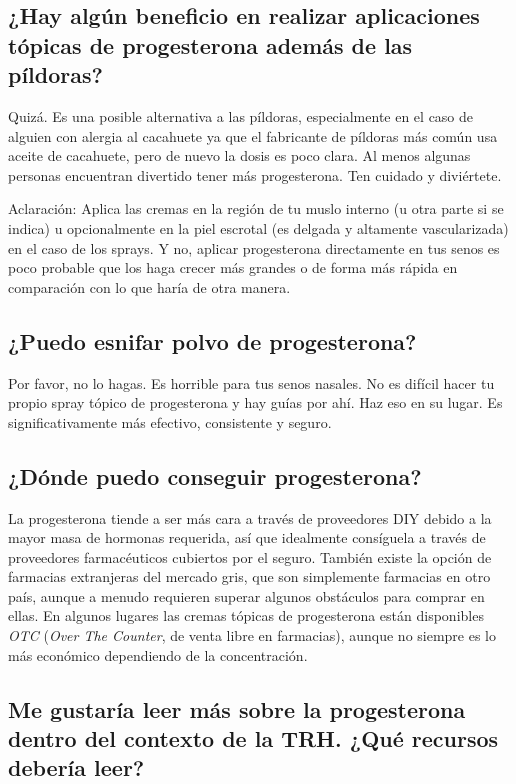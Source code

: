 \documentclass{article}
\begin{document}
\subsection{¿Hay algún beneficio en realizar aplicaciones tópicas de progesterona además de las píldoras?}

Quizá. Es una posible alternativa a las píldoras, especialmente en el caso de alguien con alergia al cacahuete ya que el fabricante de píldoras más común usa aceite de cacahuete, pero de nuevo la dosis es poco clara. Al menos algunas personas encuentran divertido tener más progesterona. Ten cuidado y diviértete.

Aclaración: Aplica las cremas en la región de tu muslo interno (u otra parte si se indica) u opcionalmente en la piel escrotal (es delgada y altamente vascularizada) en el caso de los sprays. Y no, aplicar progesterona directamente en tus senos es poco probable que los haga crecer más grandes o de forma más rápida en comparación con lo que haría de otra manera.

\subsection{¿Puedo esnifar polvo de progesterona?}

Por favor, no lo hagas. Es horrible para tus senos nasales. No es difícil hacer tu propio spray tópico de progesterona y hay guías por ahí. Haz eso en su lugar. Es significativamente más efectivo, consistente y seguro.

\subsection{¿Dónde puedo conseguir progesterona?}

La progesterona tiende a ser más cara a través de proveedores DIY debido a la mayor masa de hormonas requerida, así que idealmente consíguela a través de proveedores farmacéuticos cubiertos por el seguro. También existe la opción de farmacias extranjeras del mercado gris, que son simplemente farmacias en otro país, aunque a menudo requieren superar algunos obstáculos para comprar en ellas. En algunos lugares las cremas tópicas de progesterona están disponibles \textit{OTC} (\textit{Over The Counter}, de venta libre en farmacias), aunque no siempre es lo más económico dependiendo de la concentración.

\subsection{Me gustaría leer más sobre la progesterona dentro del contexto de la TRH. ¿Qué recursos debería leer?}\label{8-17}
\end{document}
